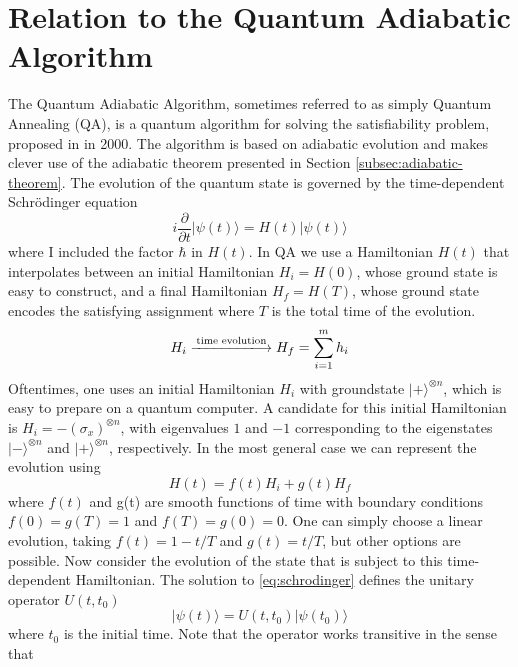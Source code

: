 \section{Relation to the Quantum Adiabatic Algorithm}
The Quantum Adiabatic Algorithm, sometimes referred to as simply Quantum Annealing (QA), is a quantum algorithm for solving the satisfiability problem, proposed in \cite{FGGS2000} in 2000. The algorithm is based on adiabatic evolution and makes clever use of the adiabatic theorem presented in Section \ref{subsec:adiabatic-theorem}. The evolution of the quantum state is governed by the time-dependent Schr\"odinger equation
\begin{equation}
	i\frac{\partial }{\partial t} |\psi(t)\rangle = H(t)|\psi(t)\rangle
	\label{eq:schrodinger}
\end{equation}
where I included the factor $\hbar$ in $H(t)$. In QA we use a Hamiltonian $H(t)$ that interpolates between an initial Hamiltonian $H_i = H(0)$, whose ground state is easy to construct, and a final Hamiltonian $H_f = H(T)$, whose ground state encodes the satisfying assignment where $T$ is the total time of the evolution.  
\begin{equation}
H_i \xlongrightarrow{\text{time evolution}} H_f = \sum_{i=1}^m h_i
\end{equation}
Oftentimes, one uses an initial Hamiltonian $H_i$ with groundstate $|+\rangle^{\otimes n}$, which is easy to prepare on a quantum computer. A candidate for this initial Hamiltonian is $H_i = -(\sigma_x)^{\otimes n}$, with eigenvalues $1$ and $-1$ corresponding to the eigenstates $|-\rangle^{\otimes n}$ and $|+\rangle^{\otimes n}$, respectively. In the most general case we can represent the evolution using \cite{adiabatic-evolution1,adiabatic-evolution2}
\begin{equation}
H(t) = f(t)H_i + g(t)H_f
\label{eq:time-dependent hamiltonian}
\end{equation}
where $f(t)$ and g(t) are smooth functions of time with boundary conditions $f(0) = g(T) = 1$ and $f(T) = g(0) = 0$. One can simply choose a linear evolution, taking $f(t) = 1-t/T$ and $g(t) = t/T$, but other options are possible. 
Now consider the evolution of the state that is subject to this time-dependent Hamiltonian. The solution to \eqref{eq:schrodinger} defines the unitary operator $U(t,t_0)$ \cite{lecture-notes-evolution}
\begin{equation}
	|\psi(t)\rangle = U(t,t_0)|\psi(t_0)\rangle
	\label{eq:time-evolution}
\end{equation}
where $t_0$ is the initial time. Note that the operator works transitive in the sense that 

